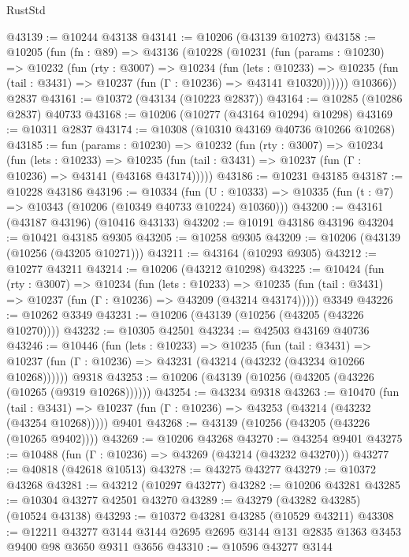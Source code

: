\begin{lexlean}{RustStd}
\begin{coremodule}
@43139 := @10244 @43138
@43141 := @10206 (@43139 @10273)
@43158 := @10205
    (fun (fn : @89) =>
    @43136
      (@10228
        (@10231
          (fun (params : @10230) =>
          @10232
            (fun (rty : @3007) =>
            @10234
              (fun (lets : @10233) =>
              @10235 (fun (tail : @3431) => @10237 (fun (Γ : @10236) => @43141 @10320))))))
        @10366))
    @2837
@43161 := @10372 (@43134 (@10223 @2837))
@43164 := @10285 (@10286 @2837) @40733
@43168 := @10206 (@10277 (@43164 @10294) @10298)
@43169 := @10311 @2837
@43174 := @10308 (@10310 @43169 @40736 @10266 @10268)
@43185 := fun (params : @10230) =>
  @10232
    (fun (rty : @3007) =>
    @10234
      (fun (lets : @10233) =>
      @10235 (fun (tail : @3431) => @10237 (fun (Γ : @10236) => @43141 (@43168 @43174)))))
@43186 := @10231 @43185
@43187 := @10228 @43186
@43196 := @10334
    (fun (U : @10333) => @10335 (fun (t : @7) => @10343 (@10206 (@10349 @40733 @10224) @10360)))
@43200 := @43161 (@43187 @43196) (@10416 @43133)
@43202 := @10191 @43186 @43196
@43204 := @10421 @43185 @9305
@43205 := @10258 @9305
@43209 := @10206 (@43139 (@10256 (@43205 @10271)))
@43211 := @43164 (@10293 @9305)
@43212 := @10277 @43211
@43214 := @10206 (@43212 @10298)
@43225 := @10424
    (fun (rty : @3007) =>
    @10234
      (fun (lets : @10233) =>
      @10235 (fun (tail : @3431) => @10237 (fun (Γ : @10236) => @43209 (@43214 @43174)))))
    @3349
@43226 := @10262 @3349
@43231 := @10206 (@43139 (@10256 (@43205 (@43226 @10270))))
@43232 := @10305 @42501
@43234 := @42503 @43169 @40736
@43246 := @10446
    (fun (lets : @10233) =>
    @10235
      (fun (tail : @3431) =>
      @10237 (fun (Γ : @10236) => @43231 (@43214 (@43232 (@43234 @10266 @10268))))))
    @9318
@43253 := @10206 (@43139 (@10256 (@43205 (@43226 (@10265 (@9319 @10268))))))
@43254 := @43234 @9318
@43263 := @10470
    (fun (tail : @3431) => @10237 (fun (Γ : @10236) => @43253 (@43214 (@43232 (@43254 @10268)))))
    @9401
@43268 := @43139 (@10256 (@43205 (@43226 (@10265 @9402))))
@43269 := @10206 @43268
@43270 := @43254 @9401
@43275 := @10488 (fun (Γ : @10236) => @43269 (@43214 (@43232 @43270)))
@43277 := @40818 (@42618 @10513)
@43278 := @43275 @43277
@43279 := @10372 @43268
@43281 := @43212 (@10297 @43277)
@43282 := @10206 @43281
@43285 := @10304 @43277 @42501 @43270
@43289 := @43279 (@43282 @43285) (@10524 @43138)
@43293 := @10372 @43281 @43285 (@10529 @43211)
@43308 := @12211
    @43277
    @3144
    @3144
    @2695
    @2695
    @3144
    @131
    @2835
    @1363
    @3453
    @9400
    @98
    @3650
    @9311
    @3656
@43310 := @10596 @43277 @3144

\end{coremodule}
\end{lexlean}
